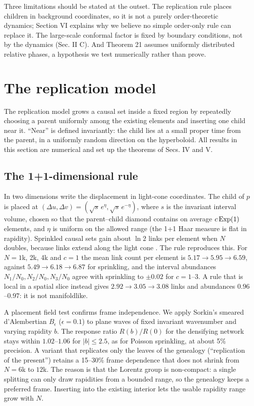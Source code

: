 Three limitations should be stated at the outset. The
replication rule places children in background coordinates,
so it is not a purely order-theoretic dynamics; Section VI
explains why we believe no simple order-only rule can
replace it. The large-scale conformal factor is fixed by
boundary conditions, not by the dynamics (Sec. II C). And
Theorem 21 assumes uniformly distributed relative phases, a
hypothesis we test numerically rather than prove.

\hypertarget{the-replication-model}{%
\section{The replication
model}\label{the-replication-model}}

The replication model grows a causal set inside a fixed
region by repeatedly choosing a parent uniformly among the
existing elements and inserting one child near it. ``Near''
is defined invariantly: the child lies at a small proper
time from the parent, in a uniformly random direction on the
hyperboloid. All results in this section are numerical and
set up the theorems of Secs. IV and V.

\hypertarget{the-11-dimensional-rule}{%
\subsection{The 1+1-dimensional
rule}\label{the-11-dimensional-rule}}

In two dimensions write the displacement in light-cone
coordinates. The child of \(p\) is placed at
\((\Delta u,\Delta v)=(\sqrt{s}\,e^{\eta},\sqrt{s}\,e^{-\eta})\),
where \(s\) is the invariant interval volume, chosen so that
the parent--child diamond contains on average
\(c\,{\rm Exp}(1)\) elements, and \(\eta\) is uniform on the
allowed range (the 1+1 Haar measure is flat in rapidity).
Sprinkled causal sets gain about \(\ln 2\) links per element
when \(N\) doubles, because links extend along the light
cone \cite{BHS09}. The rule reproduces this. For \(N=1\)k,
2k, 4k and \(c=1\) the mean link count per element is
\(5.17\to5.95\to6.59\), against \(5.49\to6.18\to6.87\) for
sprinkling, and the interval abundances
\(N_1/N_0,N_2/N_0,N_3/N_0\) agree with sprinkling to
\(\pm0.02\) for \(c=1\)--\(3\). A rule that is local in a
spatial slice instead gives \(2.92\to3.05\to3.08\) links and
abundances \(0.96\)--\(0.97\): it is not manifoldlike.

A placement field test confirms frame independence. We apply
Sorkin's smeared d'Alembertian \(B_\epsilon\)
\cite{Sorkin07} (\(\epsilon=0.1\)) to plane waves of fixed
invariant wavenumber and varying rapidity \(b\). The
response ratio \(R(b)/R(0)\) for the densifying network
stays within \(1.02\)--\(1.06\) for \(|b|\le 2.5\), as for
Poisson sprinkling, at about 5\% precision. A variant that
replicates only the leaves of the genealogy (``replication
of the present'') retains a 15--30\% frame dependence that
does not shrink from \(N=6\)k to \(12\)k. The reason is that
the Lorentz group is non-compact: a single splitting can
only draw rapidities from a bounded range, so the genealogy
keeps a preferred frame. Inserting into the existing
interior lets the usable rapidity range grow with \(N\).

